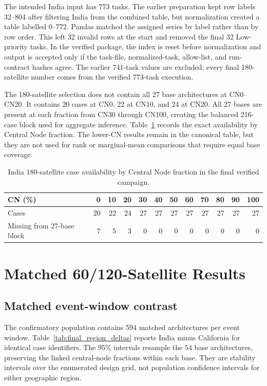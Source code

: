 The intended India input has 773 tasks. The earlier preparation kept row labels 32--804 after filtering India from the combined table, but normalization created a table labelled 0--772. Pandas matched the assigned series by label rather than by row order. This left 32 invalid rows at the start and removed the final 32 Low-priority tasks. In the verified package, the index is reset before normalization and output is accepted only if the task-file, normalized-task, allow-list, and run-contract hashes agree. The earlier 741-task values are excluded; every final 180-satellite number comes from the verified 773-task execution.

The 180-satellite selection does not contain all 27 base architectures at CN0--CN20. It contains 20 cases at CN0, 22 at CN10, and 24 at CN20. All 27 bases are present at each fraction from CN30 through CN100, creating the balanced 216-case block used for aggregate inference. Table~\ref{tab:t180_availability} records the exact availability by Central Node fraction. The lower-CN results remain in the canonical table, but they are not used for rank or marginal-mean comparisons that require equal base coverage.

\begin{table}[htbp]
\centering
\caption{India 180-satellite case availability by Central Node fraction in the final verified campaign.}
\label{tab:t180_availability}
\begin{tabular}{lrrrrrrrrrrr}
\toprule
CN (\%) & 0 & 10 & 20 & 30 & 40 & 50 & 60 & 70 & 80 & 90 & 100 \\
\midrule
Cases & 20 & 22 & 24 & 27 & 27 & 27 & 27 & 27 & 27 & 27 & 27 \\
Missing from 27-base block & 7 & 5 & 3 & 0 & 0 & 0 & 0 & 0 & 0 & 0 & 0 \\
\bottomrule
\end{tabular}
\end{table}

\section{Matched 60/120-Satellite Results}

\subsection{Matched event-window contrast}

The confirmatory population contains 594 matched architectures per event window. Table~\ref{tab:final_region_deltas} reports India minus California for identical case identifiers. The 95\% intervals resample the 54 base architectures, preserving the linked central-node fractions within each base. They are stability intervals over the enumerated design grid, not population confidence intervals for either geographic region.

